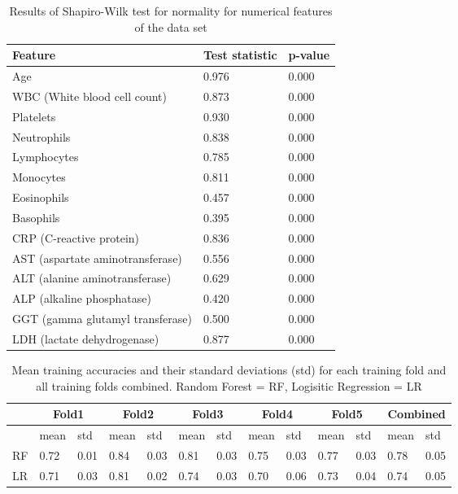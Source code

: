 \begin{table}
\begin{tabular}{lll}
Feature                          & Test statistic & p-value \\ \hline
Age                              & 0.976          & 0.000   \\
WBC (White blood cell count)     & 0.873          & 0.000   \\
Platelets                        & 0.930          & 0.000   \\
Neutrophils                      & 0.838          & 0.000   \\
Lymphocytes                      & 0.785          & 0.000   \\
Monocytes                        & 0.811          & 0.000   \\
Eosinophils                      & 0.457          & 0.000   \\
Basophils                        & 0.395          & 0.000   \\
CRP (C-reactive protein)         & 0.836          & 0.000   \\
AST (aspartate aminotransferase) & 0.556          & 0.000   \\
ALT (alanine aminotransferase)   & 0.629          & 0.000   \\
ALP (alkaline phosphatase)       & 0.420          & 0.000   \\
GGT (gamma glutamyl transferase) & 0.500          & 0.000   \\
LDH (lactate dehydrogenase)      & 0.877          & 0.000  
\end{tabular}
\caption{Results of Shapiro-Wilk test for normality for numerical features of 
the data set}
\label{tab:shapiro-wilk}
\end{table}

\begin{table}
\centering
\begin{tabular}{lllllllllllll}
 &
  \multicolumn{2}{c}{Fold1} &
  \multicolumn{2}{c}{Fold2} &
  \multicolumn{2}{c}{Fold3} &
  \multicolumn{2}{c}{Fold4} &
  \multicolumn{2}{c}{Fold5} &
  \multicolumn{2}{c}{Combined} \\ \hline
                    & mean & std  & mean & std  & mean & std  & mean & std  & 
mean & std  & mean & std  \\ \hline
RF       & 0.72 & 0.01 & 0.84 & 0.03 & 0.81 & 0.03 & 0.75 & 0.03 & 
0.77 & 0.03 & 0.78 & 0.05 \\
LR & 0.71 & 0.03 & 0.81 & 0.02 & 0.74 & 0.03 & 0.70 & 0.06 & 
0.73 & 0.04 & 0.74 & 0.05
\end{tabular}
\caption{Mean training accuracies and their standard deviations (std) 
for each training fold and all training folds combined. Random Forest = RF, 
Logisitic Regression = LR }
\label{tab:training-acc}
\end{table}

